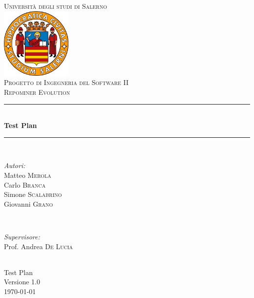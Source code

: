 \documentclass[a4paper, 12pt, italian]{report}
\begin{document}
\begin{titlepage}
\newcommand{\HRule}{\rule{\linewidth}{0.5mm}} 
\center 
\textsc{\LARGE Università degli studi di Salerno}\\[1cm] 
\includegraphics[width=3.5cm]{img/logo.jpg} \\[1cm]
\textsc{\large Progetto di Ingegneria del Software II}\\[0.5cm]
\textsc{\Large Repominer Evolution}\\[0.5cm] 
 \HRule \\[0.4cm]
{ \large \bfseries Test Plan}\\[0.4cm] 
\HRule \\[1.5cm]

\begin{minipage}{0.4\textwidth}
\begin{flushleft} \large
\emph{Autori:}\\
Matteo \textsc{Merola}\\
Carlo \textsc{Branca}\\
Simone \textsc{Scalabrino}\\
Giovanni \textsc{Grano}\\
\end{flushleft}
\end{minipage}
~
\begin{minipage}{0.4\textwidth}
\begin{flushright} \large
\emph{Supervisore:} \\
Prof. Andrea \textsc{De Lucia}
\end{flushright}
\end{minipage}\\[2.5cm]

{\Large Test Plan}\\
Versione 1.0\\[1cm]

{\large \today} %

\vfill

\end{titlepage}		
    

	\setcounter{tocdepth}{1}	
	\tableofcontents
	\listoffigures
	\listoftables
	
	
	
	
	
	
	
	

	
\end{document}
